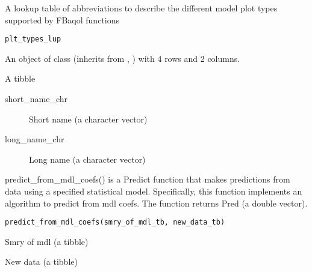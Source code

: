 \documentclass[a4paper]{book}
\begin{document}
%
\begin{Description}\relax
A lookup table of abbreviations to describe the different model plot types supported by FBaqol functions
\end{Description}
%
\begin{Usage}
\begin{verbatim}
plt_types_lup
\end{verbatim}
\end{Usage}
%
\begin{Format}
An object of class  (inherits from , ) with 4 rows and 2 columns.
\end{Format}
%
\begin{Details}\relax
A tibble

\begin{description}

\item[short\_name\_chr] Short name (a character vector)
\item[long\_name\_chr] Long name (a character vector)

\end{description}

\end{Details}
%
\begin{Description}\relax
predict\_from\_mdl\_coefs() is a Predict function that makes predictions from data using a specified statistical model. Specifically, this function implements an algorithm to predict from mdl coefs. The function returns Pred (a double vector).
\end{Description}
%
\begin{Usage}
\begin{verbatim}
predict_from_mdl_coefs(smry_of_mdl_tb, new_data_tb)
\end{verbatim}
\end{Usage}
%
\begin{Arguments}
\begin{ldescription}
\item[\code{smry\_of\_mdl\_tb}] Smry of mdl (a tibble)

\item[\code{new\_data\_tb}] New data (a tibble)
\end{ldescription}
\end{Arguments}
\end{document}
